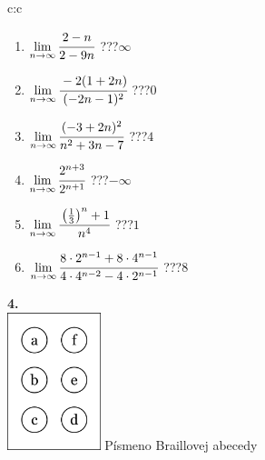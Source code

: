 \documentclass[10pt]{report}
\begin{document}
\begin{tabular}{c:c}
\begin{minipage}[c][104.5mm][t]{0.5\linewidth}
\begin{center}
\begin{minipage}{0.79\linewidth}
\begin{center}
\begin{varwidth}{\linewidth}
\begin{enumerate}
\normalsize
\item $\lim\limits_{n\to\infty}\cfrac{2-n}{2-9n}$\quad \dotfill\; ???\;\dotfill \quad $\infty$
\item $\lim\limits_{n\to\infty}\cfrac{-2(1+2n)}{(-2n-1)^2}$\quad \dotfill\; ???\;\dotfill \quad $0$
\item $\lim\limits_{n\to\infty}\cfrac{(-3+2n)^2}{n^2+3n-7}$\quad \dotfill\; ???\;\dotfill \quad $4$
\item $\lim\limits_{n\to\infty}\cfrac{2^{n+3}}{2^{n+1}}$\quad \dotfill\; ???\;\dotfill \quad $-\infty$
\item $\lim\limits_{n\to\infty}\cfrac{\left(\frac{1}{3}\right)^n +1}{n^{4}}$\quad \dotfill\; ???\;\dotfill \quad $1$
\item $\lim\limits_{n\to\infty}\cfrac{8\cdot 2^{n-1}+8\cdot 4^{n-1}}{4\cdot 4^{n-2}-4\cdot 2^{n-1}}$\quad \dotfill\; ???\;\dotfill \quad $8$
\end{enumerate}
\end{varwidth}
\end{center}
\end{minipage}
\begin{minipage}{0.20\linewidth}
\begin{center}
{\Huge\bfseries 4.} \\[2mm]
\includegraphics[height=40mm]{../images/braille.png}
{\small Písmeno Braillovej abecedy}
\end{center}
\end{minipage}
\end{center}
\end{minipage}
%
\end{tabular}
\newpage
\thispagestyle{empty}
\end{document}
